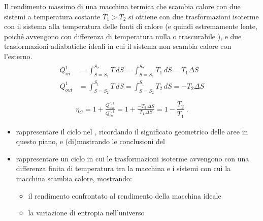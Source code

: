 \documentclass[letterpaper,10pt,italian]{jupyterBook}
\begin{document}
\sphinxAtStartPar
Il rendimento massimo di una macchina termica che scambia calore con due sistemi a temperatura costante \(T_1 > T_2\) si ottiene con due trasformazioni isoterme con il sistema alla temperatura delle fonti di calore (e quindi estremamente lente, poiché avvengono con differenza di temperatura nulla o trascurabile  ), e due trasformazioni adiabatiche ideali in cui il sistema non scambia calore con l’esterno.
\begin{equation*}
\begin{split}\begin{aligned}
  Q^{1}_{in}  & = \int_{S = S_1}^{S_2} T \, dS = \int_{S = S_1}^{S_2} T_1 \, dS =   T_1 \Delta S \\
  Q^{1}_{out} & = \int_{S = S_2}^{S_1} T \, dS = \int_{S = S_2}^{S_1} T_2 \, dS = - T_2 \Delta S \\
\end{aligned}\end{split}
\end{equation*}\begin{equation*}
\begin{split}\eta_{C} = 1 + \frac{Q^{e,1}_{out}}{Q^{e,1}_{in}} = 1 + \frac{-T_2 \, \Delta S}{T_1 \, \Delta S} = 1 - \dfrac{T_2}{T_1} \ .\end{split}
\end{equation*}
\sphinxAtStartPar
{}
\begin{itemize}
\item {} 
\sphinxAtStartPar
rappresentare il ciclo nel {\hyperref[\detokenize{ch/thermodynamics/principles-phase-diagrams:physics-hs-thermodynamics-foundation-principles-phase-diagrams-gas-1-ts}]{}}, ricordando il significato geometrico delle aree in questo piano, e (di)mostrando le conclusioni del {\hyperref[\detokenize{ch/thermodynamics/heat-engine-carnot:physics-hs-thermodynamics-heat-engine-carnot-td-cycle-theorem}]{}}

\item {} 
\sphinxAtStartPar
rappresentare un ciclo in cui le trasformazioni isoterme avvengono con una differenza finita di temperatura tra la macchina e i sistemi con cui la macchina scambia calore, mostrando:
\begin{itemize}
\item {} 
\sphinxAtStartPar
il rendimento confrontato al rendimento della macchina ideale

\item {} 
\sphinxAtStartPar
la variazione di entropia nell’universo

\end{itemize}

\end{itemize}
\end{document}
